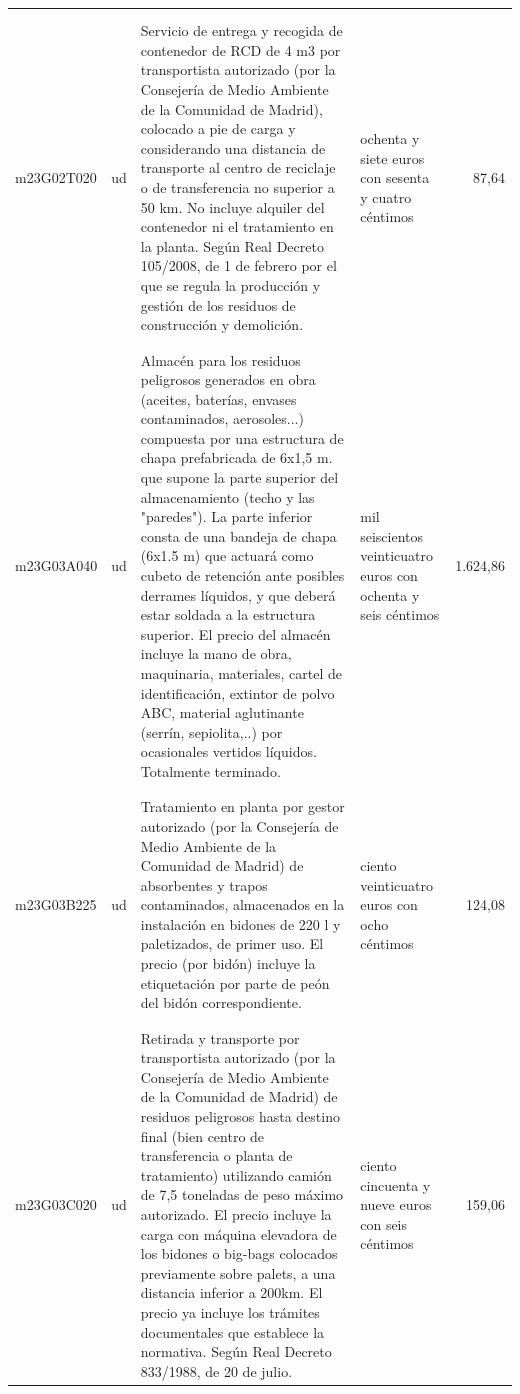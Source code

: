 \begin{supertabular}{|l|l|p{5cm}|p{3cm}|r|}
&&&&\\%
&&&&\\%
m23G02T020&ud&Servicio de entrega y recogida de contenedor de RCD de 4 m3 por transportista autorizado (por la Consejería de Medio Ambiente de la Comunidad de Madrid), colocado a pie de carga y considerando una distancia de transporte al centro de reciclaje o de transferencia no superior a 50 km. No incluye alquiler del contenedor ni el tratamiento en la planta. Según Real Decreto 105/2008, de 1 de febrero por el que se regula la producción y gestión de los residuos de construcción y demolición.&ochenta y siete euros con sesenta y cuatro céntimos&87,64\\%
&&&&\\%
&&&&\\%
m23G03A040&ud&Almacén para los residuos peligrosos generados en obra (aceites, baterías, envases contaminados, aerosoles...) compuesta por una estructura de chapa prefabricada de 6x1,5 m. que supone la parte superior del almacenamiento (techo y las "paredes"). La parte inferior consta de una bandeja de chapa (6x1.5 m) que actuará como cubeto de retención ante posibles derrames líquidos, y que deberá estar soldada a la estructura superior. El precio del almacén incluye la mano de obra, maquinaria, materiales, cartel de identificación, extintor de polvo ABC, material aglutinante (serrín, sepiolita,..) por ocasionales vertidos líquidos. Totalmente terminado.&mil seiscientos veinticuatro euros con ochenta y seis céntimos&1.624,86\\%
&&&&\\%
&&&&\\%
m23G03B225&ud&Tratamiento en planta por gestor autorizado (por la Consejería de Medio Ambiente de la Comunidad de Madrid) de absorbentes y trapos contaminados, almacenados en la instalación en bidones de 220 l y paletizados, de primer uso. El precio (por bidón) incluye la etiquetación por parte de peón del bidón correspondiente.&ciento veinticuatro euros con ocho céntimos&124,08\\%
&&&&\\%
&&&&\\%
m23G03C020&ud&Retirada y transporte por transportista autorizado (por la Consejería de Medio Ambiente de la Comunidad de Madrid) de residuos peligrosos hasta destino final (bien centro de transferencia o planta de tratamiento) utilizando camión de 7,5 toneladas de peso máximo autorizado. El precio incluye la carga con máquina elevadora de los bidones o big{-}bags colocados previamente sobre palets, a una distancia inferior a 200km. El precio ya incluye los trámites documentales que establece la normativa. Según Real Decreto 833/1988, de 20 de julio.&ciento cincuenta y nueve euros con seis céntimos&159,06\\%

\end{supertabular}
